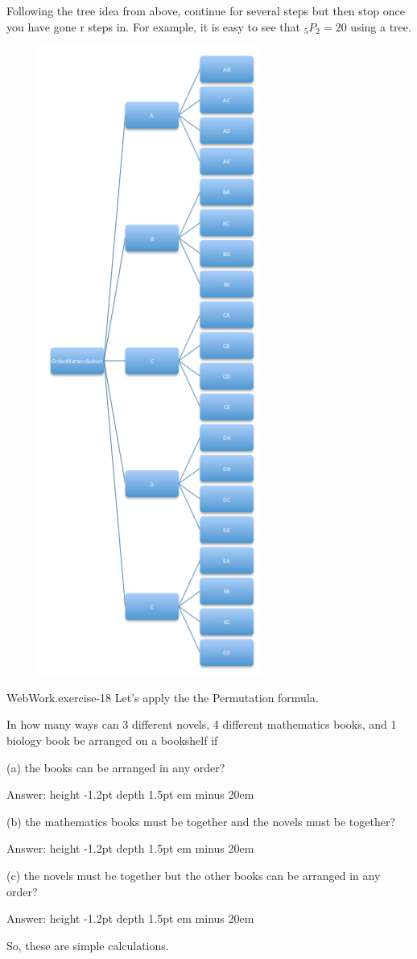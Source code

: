 \documentclass[10pt,]{book}
\newcommand{\fillin}[1]{\leavevmode\leaders\vrule height -1.2pt depth 1.5pt \hskip #1em minus #1em \null}
\numberwithin{equation}{section}
\begin{document}
Following the tree idea from above, continue for several steps but then stop once you have gone r steps in.  For example, it is easy to see that \(_5P_2 = 20\) using a tree. \begin{figure}\centering\includegraphics[width=0.5\linewidth]{images/PermutationSubTree.png}
\end{figure}%
\par
\hypertarget{p-375}{}%
\begin{inlineexercise}{WebWork.}{exercise-18}%
\hypertarget{p-376}{}%
Let's apply the the Permutation formula.%
\par\medskip
\hypertarget{p-377}{}%
In how many ways can 3 different novels, 4 different mathematics books, and 1 biology book be arranged on a bookshelf if%
\par
\hypertarget{p-378}{}%
(a) the books can be arranged in any order?%
\par
\hypertarget{p-379}{}%
Answer:  \fillin{20}%
\par
\hypertarget{p-380}{}%
(b) the mathematics books must be together and the novels must be together?%
\par
\hypertarget{p-381}{}%
Answer:  \fillin{20}%
\par
\hypertarget{p-382}{}%
(c) the novels must be together but the other books can be arranged in any order?%
\par
\hypertarget{p-383}{}%
Answer:  \fillin{20}%
\par\medskip\noindent \hypertarget{p-384}{}%
So, these are simple calculations.%
\par
\end{inlineexercise}
\end{document}
